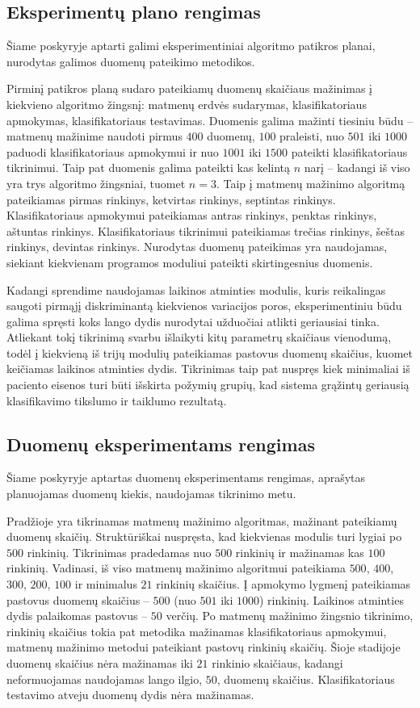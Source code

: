 \documentclass[]{vgtuef}
\begin{document}
\subsection{Eksperimentų plano rengimas}

Šiame poskyryje aptarti galimi eksperimentiniai algoritmo patikros planai, nurodytas galimos duomenų pateikimo metodikos.

Pirminį patikros planą sudaro pateikiamų duomenų skaičiaus mažinimas į kiekvieno algoritmo žingsnį: matmenų erdvės sudarymas, klasifikatoriaus apmokymas, klasifikatoriaus testavimas. Duomenis galima mažinti tiesiniu būdu -- matmenų mažinime naudoti pirmus $400$ duomenų, $100$ praleisti, nuo $501$ iki $1000$ paduodi klasifikatoriaus apmokymui ir nuo $1001$ iki $1500$ pateikti klasifikatoriaus tikrinimui. Taip pat duomenis galima pateikti kas kelintą $n$ narį -- kadangi iš viso yra trys algoritmo žingsniai, tuomet $n=3$. Taip į matmenų mažinimo algoritmą pateikiamas pirmas rinkinys, ketvirtas rinkinys, septintas rinkinys. Klasifikatoriaus apmokymui pateikiamas antras rinkinys, penktas rinkinys, aštuntas rinkinys. Klasifikatoriaus tikrinimui pateikiamas trečias rinkinys, šeštas rinkinys, devintas rinkinys. Nurodytas duomenų pateikimas yra naudojamas, siekiant kiekvienam programos moduliui pateikti skirtingesnius duomenis. 

Kadangi sprendime naudojamas laikinos atminties modulis, kuris reikalingas saugoti pirmąjį diskriminantą kiekvienos variacijos poros, eksperimentiniu būdu galima spręsti koks lango dydis nurodytai užduočiai atlikti geriausiai tinka. Atliekant tokį tikrinimą svarbu išlaikyti kitų parametrų skaičiaus vienodumą, todėl į kiekvieną iš trijų modulių pateikiamas pastovus duomenų skaičius, kuomet keičiamas laikinos atminties dydis. Tikrinimas taip pat nuspręs kiek minimaliai iš paciento eisenos turi būti išskirta požymių grupių, kad sistema grąžintų geriausią klasifikavimo tikslumo ir taiklumo rezultatą.

\subsection{Duomenų eksperimentams rengimas}

Šiame poskyryje aptartas duomenų eksperimentams rengimas, aprašytas planuojamas duomenų kiekis, naudojamas tikrinimo metu.

Pradžioje yra tikrinamas matmenų mažinimo algoritmas, mažinant pateikiamų duomenų skaičių. Struktūriškai nuspręsta, kad kiekvienas modulis turi lygiai po $500$ rinkinių. Tikrinimas pradedamas nuo $500$ rinkinių ir mažinamas kas $100$ rinkinių. Vadinasi, iš viso matmenų mažinimo algoritmui pateikiama $500$, $400$, $300$, $200$, $100$ ir minimalus $21$ rinkinių skaičius. Į apmokymo lygmenį pateikiamas pastovus duomenų skaičius -- $500$ (nuo $501$ iki $1000$) rinkinių. Laikinos atminties dydis palaikomas pastovus -- $50$ verčių. Po matmenų mažinimo žingsnio tikrinimo, rinkinių skaičius tokia pat metodika mažinamas klasifikatoriaus apmokymui, matmenų mažinimo metodui pateikiant pastovų rinkinių skaičių. Šioje stadijoje duomenų skaičius nėra mažinamas iki $21$ rinkinio skaičiaus, kadangi neformuojamas naudojamas lango ilgio, $50$, duomenų skaičius. Klasifikatoriaus testavimo atveju duomenų dydis nėra mažinamas.
\end{document}
